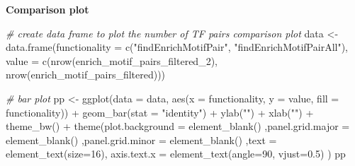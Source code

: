 \documentclass[
]{article}
\newenvironment{Shaded}{}{}
\newcommand{\AttributeTok}[1]{\textcolor[rgb]{0.49,0.56,0.16}{#1}}
\newcommand{\CommentTok}[1]{\textcolor[rgb]{0.38,0.63,0.69}{\textit{#1}}}
\newcommand{\DecValTok}[1]{\textcolor[rgb]{0.25,0.63,0.44}{#1}}
\newcommand{\FloatTok}[1]{\textcolor[rgb]{0.25,0.63,0.44}{#1}}
\newcommand{\FunctionTok}[1]{\textcolor[rgb]{0.02,0.16,0.49}{#1}}
\newcommand{\NormalTok}[1]{#1}
\newcommand{\OtherTok}[1]{\textcolor[rgb]{0.00,0.44,0.13}{#1}}
\newcommand{\SpecialCharTok}[1]{\textcolor[rgb]{0.25,0.44,0.63}{#1}}
\newcommand{\StringTok}[1]{\textcolor[rgb]{0.25,0.44,0.63}{#1}}
\begin{document}
\textbf{Comparison plot}

\begin{Shaded}
\begin{Highlighting}[]
\CommentTok{\# create data frame to plot the number of TF pairs comparison plot}
\NormalTok{data }\OtherTok{\textless{}{-}} \FunctionTok{data.frame}\NormalTok{(}\AttributeTok{functionality =} \FunctionTok{c}\NormalTok{(}\StringTok{"findEnrichMotifPair"}\NormalTok{, }\StringTok{"findEnrichMotifPairAll"}\NormalTok{), }\AttributeTok{value =} \FunctionTok{c}\NormalTok{(}\FunctionTok{nrow}\NormalTok{(enrich\_motif\_pairs\_filtered\_2), }\FunctionTok{nrow}\NormalTok{(enrich\_motif\_pairs\_filtered)))}

\CommentTok{\# bar plot}
\NormalTok{pp }\OtherTok{\textless{}{-}} \FunctionTok{ggplot}\NormalTok{(}\AttributeTok{data =}\NormalTok{ data, }
             \FunctionTok{aes}\NormalTok{(}\AttributeTok{x =}\NormalTok{ functionality, }\AttributeTok{y =}\NormalTok{ value, }\AttributeTok{fill =}\NormalTok{ functionality)) }\SpecialCharTok{+} 
    \FunctionTok{geom\_bar}\NormalTok{(}\AttributeTok{stat =} \StringTok{"identity"}\NormalTok{) }\SpecialCharTok{+} 
    \FunctionTok{ylab}\NormalTok{(}\StringTok{""}\NormalTok{) }\SpecialCharTok{+} \FunctionTok{xlab}\NormalTok{(}\StringTok{""}\NormalTok{) }\SpecialCharTok{+} \FunctionTok{theme\_bw}\NormalTok{() }\SpecialCharTok{+} 
    \FunctionTok{theme}\NormalTok{(}\AttributeTok{plot.background =} \FunctionTok{element\_blank}\NormalTok{()}
\NormalTok{    ,}\AttributeTok{panel.grid.major =} \FunctionTok{element\_blank}\NormalTok{()}
\NormalTok{    ,}\AttributeTok{panel.grid.minor =} \FunctionTok{element\_blank}\NormalTok{()}
\NormalTok{    ,}\AttributeTok{text =} \FunctionTok{element\_text}\NormalTok{(}\AttributeTok{size=}\DecValTok{16}\NormalTok{), }\AttributeTok{axis.text.x =} \FunctionTok{element\_text}\NormalTok{(}\AttributeTok{angle=}\DecValTok{90}\NormalTok{, }\AttributeTok{vjust=}\FloatTok{0.5}\NormalTok{)}
\NormalTok{)}
\NormalTok{pp}
\end{Highlighting}
\end{Shaded}
\end{document}
